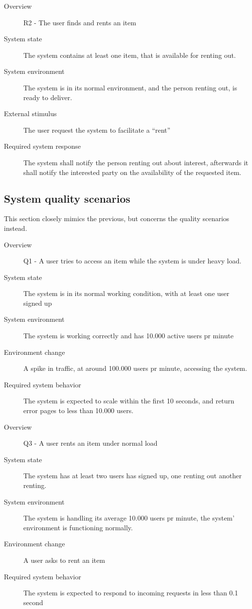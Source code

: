 \documentclass[a4paper,11pt]{report}
\begin{document}
\begin{description}
    \item[Overview] R2 - The user finds and rents an item
    \item[System state] The system contains at least one item, that is
        available for renting out.
    \item[System environment] The system is in its normal environment, and the
        person renting out, is ready to deliver.
    \item[External stimulus] The user request the system to facilitate a
        ``rent''
    \item[Required system response] The system shall notify the person renting
        out about interest, afterwards it shall notify the interested party on
        the availability of the requested item.
\end{description}


\subsection{System quality scenarios}
\label{sec:syst-qual-scen}
This section closely mimics the previous, but concerns the quality scenarios
instead.

\begin{description}
    \item[Overview] Q1 - A user tries to access an item while the system is
        under heavy load.
    \item[System state] The system is in its normal working condition, with at
        least one user signed up
    \item[System environment] The system is working correctly and has 10.000
        active users pr minute
    \item[Environment change] A spike in traffic, at around 100.000 users pr
        minute, accessing the system.
    \item[Required system behavior] The system is expected to scale within the
        first 10 seconds, and return error pages to less than 10.000 users.
\end{description}

\begin{description}
    \item[Overview] Q3 - A user rents an item under normal load
    \item[System state] The system has at least two users has signed up, one
        renting out another renting.
    \item[System environment] The system is handling its average 10.000 users pr
        minute, the system' environment is functioning normally.
    \item[Environment change] A user asks to rent an item
    \item[Required system behavior] The system is expected to respond to
        incoming requests in less than 0.1 second
\end{description}
\end{document}
